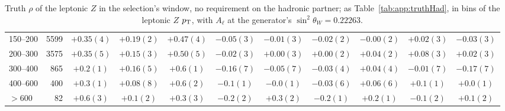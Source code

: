 \begin{table}[htbp]
\begin{tabular}{lrccccccccc}
150--200 & 5599 & $+0.35(4)$ & $+0.19(2)$ & $+0.47(4)$ & $-0.05(3)$ & $-0.01(3)$ & $-0.02(2)$ & $-0.00(2)$ & $+0.02(3)$ & $-0.03(3)$ \\
200--300 & 3575 & $+0.35(5)$ & $+0.15(3)$ & $+0.50(5)$ & $-0.02(3)$ & $+0.00(3)$ & $+0.00(2)$ & $+0.04(2)$ & $+0.08(3)$ & $+0.02(3)$ \\
300--400 & 865 & $+0.2(1)$ & $+0.16(5)$ & $+0.6(1)$ & $-0.16(7)$ & $-0.05(7)$ & $-0.03(4)$ & $+0.04(4)$ & $-0.01(7)$ & $-0.17(7)$ \\
400--600 & 400 & $+0.3(1)$ & $+0.08(8)$ & $+0.6(2)$ & $-0.1(1)$ & $-0.0(1)$ & $-0.03(6)$ & $+0.06(6)$ & $+0.1(1)$ & $+0.0(1)$ \\
$> 600$ & 82 & $+0.6(3)$ & $+0.1(2)$ & $+0.3(3)$ & $-0.2(2)$ & $+0.3(2)$ & $-0.2(1)$ & $+0.2(1)$ & $-0.1(2)$ & $+0.1(2)$ \\
\bottomrule
\end{tabular}
\caption{Truth $\rho$ of the leptonic $Z$ in the selection's window, no requirement on the hadronic partner; as
Table~\ref{tab:app:truthHad}, in bins of the leptonic $Z$ $p_{\mathrm{T}}$, with $A_\ell$ at the generator's
$\sin^2\theta_W = 0.22263$.}
\label{tab:app:truthLep}
\end{table}

